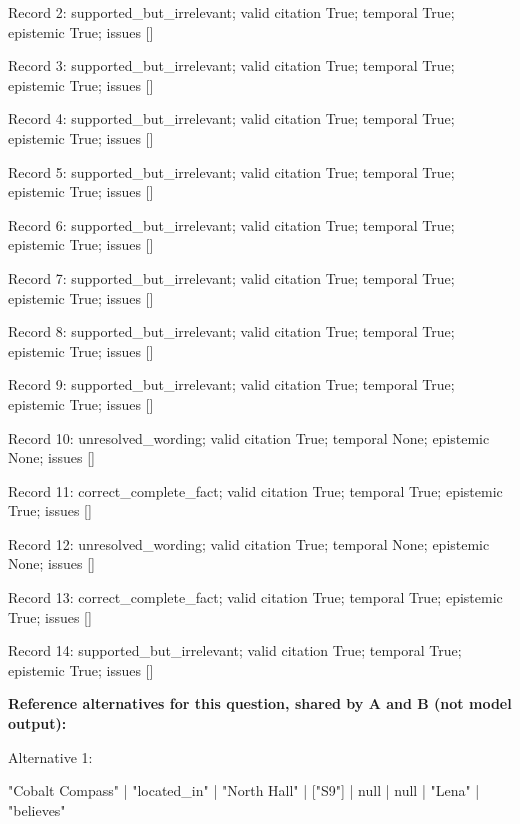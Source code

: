 Record 2: supported\_but\_irrelevant; valid citation True; temporal True; epistemic True; issues []\par

Record 3: supported\_but\_irrelevant; valid citation True; temporal True; epistemic True; issues []\par

Record 4: supported\_but\_irrelevant; valid citation True; temporal True; epistemic True; issues []\par

Record 5: supported\_but\_irrelevant; valid citation True; temporal True; epistemic True; issues []\par

Record 6: supported\_but\_irrelevant; valid citation True; temporal True; epistemic True; issues []\par

Record 7: supported\_but\_irrelevant; valid citation True; temporal True; epistemic True; issues []\par

Record 8: supported\_but\_irrelevant; valid citation True; temporal True; epistemic True; issues []\par

Record 9: supported\_but\_irrelevant; valid citation True; temporal True; epistemic True; issues []\par

Record 10: unresolved\_wording; valid citation True; temporal None; epistemic None; issues []\par

Record 11: correct\_complete\_fact; valid citation True; temporal True; epistemic True; issues []\par

Record 12: unresolved\_wording; valid citation True; temporal None; epistemic None; issues []\par

Record 13: correct\_complete\_fact; valid citation True; temporal True; epistemic True; issues []\par

Record 14: supported\_but\_irrelevant; valid citation True; temporal True; epistemic True; issues []\par

\noindent\textbf{Reference alternatives for this question, shared by A and B (not model output):}

\noindent Alternative 1:

"Cobalt Compass" | "located\_in" | "North Hall" | ["S9"] | null | null | "Lena" | "believes"\par\smallskip

